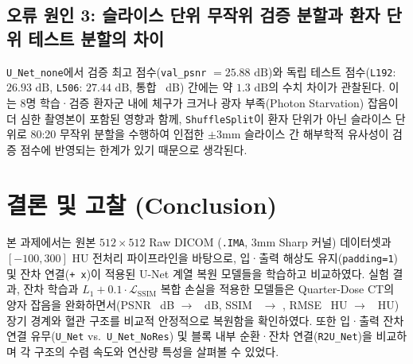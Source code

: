 \documentclass[10pt,a4paper]{article}
\begin{document}
\subsection{오류 원인 3: 슬라이스 단위 무작위 검증 분할과 환자 단위 테스트 분할의 차이}
\texttt{U\_Net\_none}에서 검증 최고 점수(\texttt{val\_psnr} $= 25.88\text{ dB}$)와 독립 테스트 점수(\texttt{L192}: $26.93\text{ dB}$, \texttt{L506}: $27.44\text{ dB}$, 통합 \UNetPSNR\ dB) 간에는 약 $1.3\text{ dB}$의 수치 차이가 관찰된다. 이는 8명 학습·검증 환자군 내에 체구가 크거나 광자 부족(Photon Starvation) 잡음이 더 심한 촬영본이 포함된 영향과 함께, \texttt{ShuffleSplit}이 환자 단위가 아닌 슬라이스 단위로 80:20 무작위 분할을 수행하여 인접한 $\pm 3\text{mm}$ 슬라이스 간 해부학적 유사성이 검증 점수에 반영되는 한계가 있기 때문으로 생각된다.

\section{결론 및 고찰 (Conclusion)}

본 과제에서는 원본 $512\times 512$ Raw DICOM (\texttt{.IMA}, 3mm Sharp 커널) 데이터셋과 $[-100, 300]\text{ HU}$ 전처리 파이프라인을 바탕으로, 입·출력 해상도 유지(\texttt{padding=1}) 및 잔차 연결(\texttt{+ x})이 적용된 U-Net 계열 복원 모델들을 학습하고 비교하였다. 실험 결과, 잔차 학습과 $L_1 + 0.1\cdot\mathcal{L}_{\mathrm{SSIM}}$ 복합 손실을 적용한 모델들은 Quarter-Dose CT의 양자 잡음을 완화하면서(PSNR \BasePSNR\ dB $\rightarrow$ \BestPSNR\ dB, SSIM \BaseSSIM\ $\rightarrow$ \BestSSIM, RMSE \BaseRMSEHU\ HU $\rightarrow$ \BestRMSEHU\ HU) 장기 경계와 혈관 구조를 비교적 안정적으로 복원함을 확인하였다. 또한 입·출력 잔차 연결 유무(\texttt{U\_Net} vs.\ \texttt{U\_Net\_NoRes}) 및 블록 내부 순환·잔차 연결(\texttt{R2U\_Net})을 비교하며 각 구조의 수렴 속도와 연산량 특성을 살펴볼 수 있었다.
\end{document}
